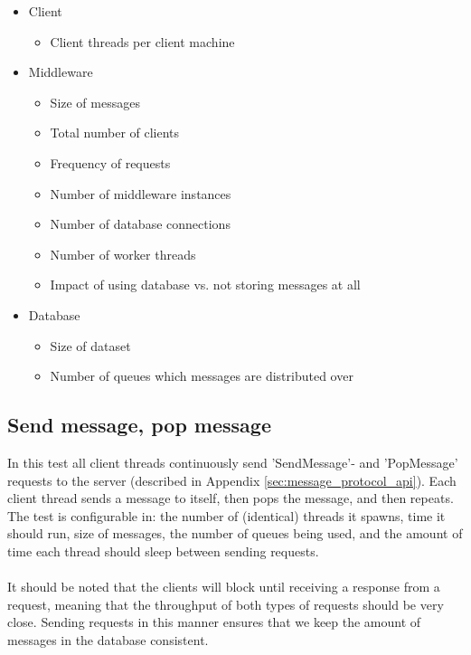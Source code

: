 \documentclass{article}
\begin{document}
        \begin{itemize}
            \item Client
            \begin{itemize}
                \item Client threads per client machine
            \end{itemize}
            \item Middleware
            \begin{itemize}
                \item Size of messages
                \item Total number of clients
                \item Frequency of requests
                \item Number of middleware instances
                \item Number of database connections
                \item Number of worker threads
                \item Impact of using database vs. not storing messages at all
            \end{itemize}
            \item Database
            \begin{itemize}
                \item Size of dataset
                \item Number of queues which messages are distributed over
            \end{itemize}
        \end{itemize}

        \subsection{Send message, pop message}
            In this test all client threads continuously send 'SendMessage'- and 'PopMessage' requests to the server (described in Appendix \ref{sec:message_protocol_api}). Each client thread sends a message to itself, then pops the message, and then repeats.\\ The test is configurable in: the number of (identical) threads it spawns, time it should run, size of messages, the number of queues being used, and the amount of time each thread should sleep between sending requests.\\
            \\
            It should be noted that the clients will block until receiving a response from a request, meaning that the throughput of both types of requests should be very close. Sending requests in this manner ensures that we keep the amount of messages in the database consistent.
\end{document}
